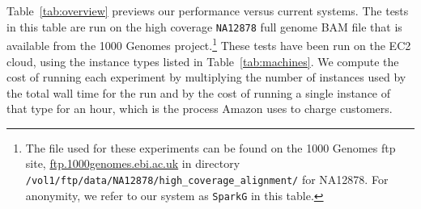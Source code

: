\documentclass{acm_proc_article-sp}
\begin{document}
Table~\ref{tab:overview} previews our performance versus current systems. The tests in this table are run on the
high coverage \texttt{NA12878} full genome BAM file that is available from the 1000 Genomes
project.\footnote{The file used for these experiments can be found on the
1000 Genomes ftp site, \url{ftp.1000genomes.ebi.ac.uk} in directory 
\texttt{/vol1/ftp/data/NA12878/high\_coverage\_alignment/} for NA12878. For anonymity, we refer to our system
as \texttt{SparkG} in this table.} These tests have been run on the EC2 cloud, using the instance types listed in
Table~\ref{tab:machines}. We compute the cost of running each experiment by multiplying the number of instances
used by the total wall time for the run and by the cost of running a single instance of that type for an hour, which is
the process Amazon uses to charge customers.
\end{document}
